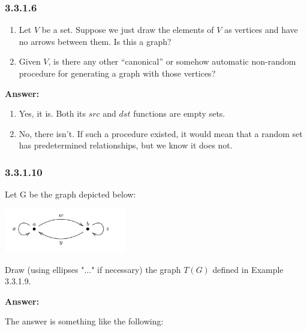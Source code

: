 \documentclass{article}
\newcommand{\vsp}[0]{\vspace*{10pt}\par}
\newcommand{\exercise}[1]{\subsubsection*{#1}}
\newcommand{\ans}[0]{\vsp\textbf{Answer: }\vsp}
\newcommand{\ei}{\item}
\newcommand{\es}{\begin{enumerate}[label=(\alph*)]\ei}
\newcommand{\ee}{\end{enumerate}}
\begin{document}
\exercise{3.3.1.6}

\es Let $V$ be a set. Suppose we just draw the elements of $V$ as vertices and
    have no arrows between them. Is this a graph?
\ei Given $V$, is there any other “canonical” or somehow automatic non-random
    procedure for generating a graph with those vertices?
\ee

\ans

\es Yes, it is. Both its $src$ and $dst$ functions are empty sets.
\ei No, there isn't. If such a procedure existed, it would mean that a random
    set has predetermined relationships, but we know it does not.
\ee

\exercise{3.3.1.10}

Let G be the graph depicted below:

\begin{center}
\includegraphics[width=0.4\textwidth]{img/ex33110.png}
\end{center}

Draw (using ellipses "$\ldots$" if necessary) the graph $T(G)$ defined in Example
3.3.1.9.

\ans

The answer is something like the following:

\begin{center}
\end{center}
\end{document}
